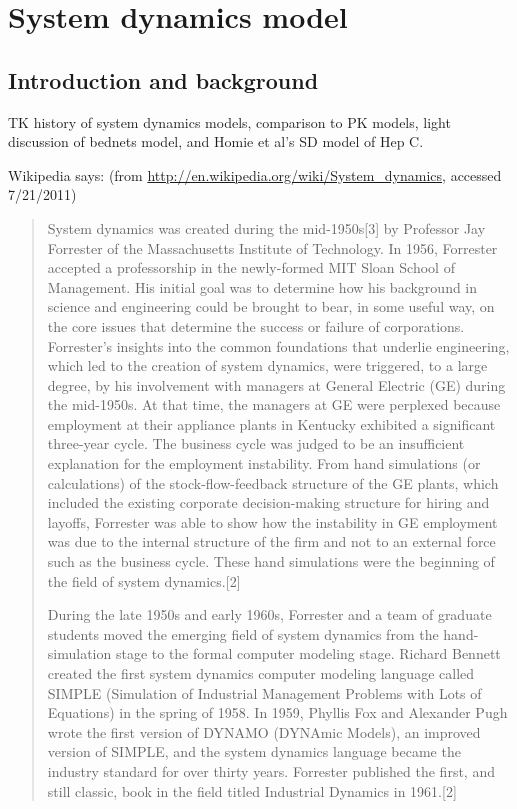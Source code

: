 \section{System dynamics model}

\subsection{Introduction and background}

TK history of system dynamics models, comparison to PK models, light
discussion of bednets model, and Homie et al's SD model of Hep C.

Wikipedia says: (from \url{http://en.wikipedia.org/wiki/System_dynamics}, accessed 7/21/2011)
\begin{quote}
System dynamics was created during the mid-1950s[3] by Professor Jay
Forrester of the Massachusetts Institute of Technology. In 1956,
Forrester accepted a professorship in the newly-formed MIT Sloan
School of Management. His initial goal was to determine how his
background in science and engineering could be brought to bear, in
some useful way, on the core issues that determine the success or
failure of corporations. Forrester's insights into the common
foundations that underlie engineering, which led to the creation of
system dynamics, were triggered, to a large degree, by his involvement
with managers at General Electric (GE) during the mid-1950s. At that
time, the managers at GE were perplexed because employment at their
appliance plants in Kentucky exhibited a significant three-year
cycle. The business cycle was judged to be an insufficient explanation
for the employment instability. From hand simulations (or
calculations) of the stock-flow-feedback structure of the GE plants,
which included the existing corporate decision-making structure for
hiring and layoffs, Forrester was able to show how the instability in
GE employment was due to the internal structure of the firm and not to
an external force such as the business cycle. These hand simulations
were the beginning of the field of system dynamics.[2]

During the late 1950s and early 1960s, Forrester and a team of
graduate students moved the emerging field of system dynamics from the
hand-simulation stage to the formal computer modeling stage. Richard
Bennett created the first system dynamics computer modeling language
called SIMPLE (Simulation of Industrial Management Problems with Lots
of Equations) in the spring of 1958. In 1959, Phyllis Fox and
Alexander Pugh wrote the first version of DYNAMO (DYNAmic Models), an
improved version of SIMPLE, and the system dynamics language became
the industry standard for over thirty years. Forrester published the
first, and still classic, book in the field titled Industrial Dynamics
in 1961.[2]


\end{quote}
